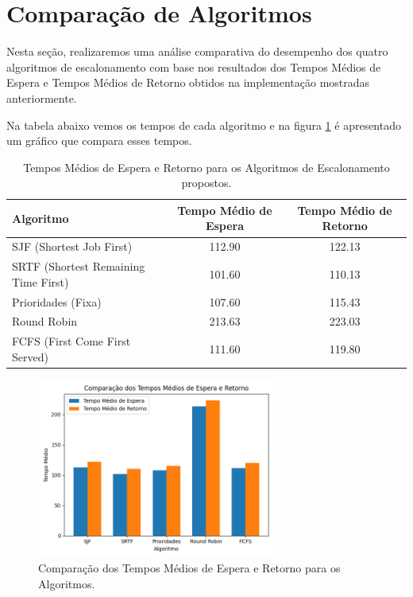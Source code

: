 \documentclass[
	12pt,				%
	openright,			%
	oneside,			%
	a4paper,			%
	chapter=TITLE,		%
	english,			%
	french,				%
	spanish,			%
	brazil				%
	]{abntex2}
\theoremstyle{definition}
\begin{document}
\section{Comparação de Algoritmos}
Nesta seção, realizaremos uma análise comparativa do desempenho dos quatro algoritmos de escalonamento 
com base nos resultados dos Tempos Médios de Espera e Tempos Médios de Retorno obtidos na implementação 
mostradas anteriormente.

Na tabela abaixo vemos os tempos de cada algoritmo e na figura \ref{fig:graf} é apresentado um
gráfico que compara esses tempos.


\begin{table}[ht]
    \centering
    \begin{tabular}{|l|c|c|}
    \hline
    \textbf{Algoritmo} & \textbf{Tempo Médio de Espera} & \textbf{Tempo Médio de Retorno} \\
    \hline
    SJF (Shortest Job First) & 112.90 & 122.13 \\
    SRTF (Shortest Remaining Time First) & 101.60 & 110.13 \\
    Prioridades (Fixa) & 107.60 & 115.43 \\
    Round Robin & 213.63 & 223.03 \\
    FCFS (First Come First Served) & 111.60 & 119.80 \\
    \hline
    \end{tabular}
    \caption{Tempos Médios de Espera e Retorno para os Algoritmos de Escalonamento propostos.}
\end{table}

\begin{figure}[H]
        \centering
        \includegraphics[width=0.7\textwidth]{imagens/grafico_bench.png}
        \caption{Comparação dos Tempos Médios de Espera e Retorno para os Algoritmos.}
        \label{fig:graf}
\end{figure}
\end{document}
